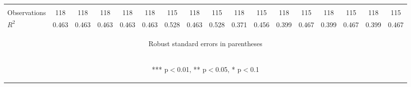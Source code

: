 \begin{center}
\begin{tabular}{lcccccccccccccccc}
\vspace{4pt} & \begin{footnotesize}\end{footnotesize} & \begin{footnotesize}\end{footnotesize} & \begin{footnotesize}\end{footnotesize} & \begin{footnotesize}\end{footnotesize} & \begin{footnotesize}\end{footnotesize} & \begin{footnotesize}\end{footnotesize} & \begin{footnotesize}\end{footnotesize} & \begin{footnotesize}\end{footnotesize} & \begin{footnotesize}\end{footnotesize} & \begin{footnotesize}\end{footnotesize} & \begin{footnotesize}\end{footnotesize} & \begin{footnotesize}\end{footnotesize} & \begin{footnotesize}\end{footnotesize} & \begin{footnotesize}\end{footnotesize} & \begin{footnotesize}\end{footnotesize} & \begin{footnotesize}\end{footnotesize} \\
Observations & 118 & 118 & 118 & 118 & 118 & 115 & 118 & 115 & 118 & 115 & 118 & 115 & 118 & 115 & 118 & 115 \\
 $R^2$ & 0.463 & 0.463 & 0.463 & 0.463 & 0.463 & 0.528 & 0.463 & 0.528 & 0.371 & 0.456 & 0.399 & 0.467 & 0.399 & 0.467 & 0.399 & 0.467 \\ \hline
\multicolumn{17}{c}{\begin{footnotesize} Robust standard errors in parentheses\end{footnotesize}} \\
\multicolumn{17}{c}{\begin{footnotesize} *** p$<$0.01, ** p$<$0.05, * p$<$0.1\end{footnotesize}} \\
\end{tabular}
\end{center}
